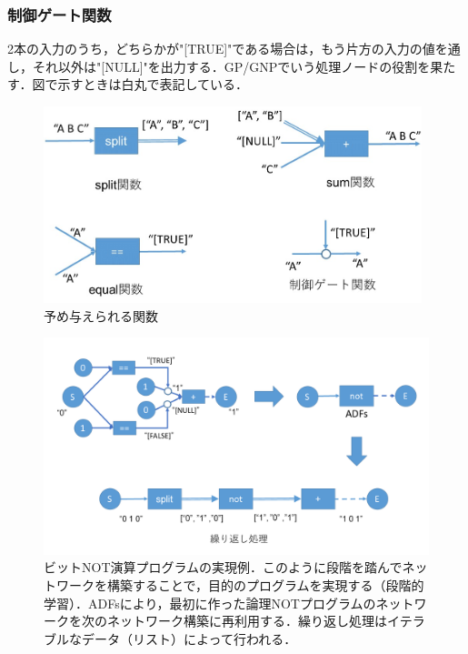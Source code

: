 \documentclass[exploratorypaper]{jsaiart} %
\begin{document}
\subsubsection{制御ゲート関数}
2本の入力のうち，どちらかが"[TRUE]"である場合は，もう片方の入力の値を通し，それ以外は"[NULL]"を出力する．GP/GNPでいう処理ノードの役割を果たす．図で示すときは白丸で表記している．

\begin{figure}[t]
    \begin{center}
        \includegraphics[width=110mm]{func.jpg}
    \end{center}
    \capwidth=90mm %
    \caption{予め与えられる関数}
    \label{fig:func}
\end{figure}

\begin{figure}[t]
    \begin{center}
        \includegraphics[width=150mm]{bitwise_not.png}
    \end{center}
    \capwidth=130mm %
    \caption{ビットNOT演算プログラムの実現例．このように段階を踏んでネットワークを構築することで，目的のプログラムを実現する（段階的学習）．ADFsにより，最初に作った論理NOTプログラムのネットワークを次のネットワーク構築に再利用する．繰り返し処理はイテラブルなデータ（リスト）によって行われる．}
    \label{fig:bitwise_not}
\end{figure}
\end{document}
